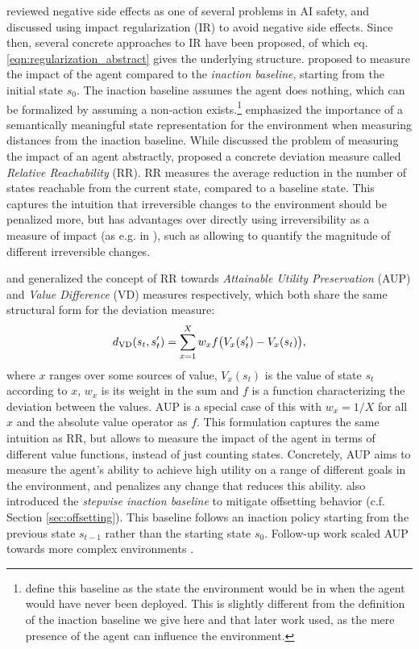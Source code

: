 \documentclass[letterpaper]{article} %
\begin{document}
\citet{amodei2016concrete} reviewed negative side effects as one of several problems in AI safety, and discussed using impact regularization (IR) to avoid negative side effects.
Since then, several concrete approaches to IR have been proposed, of which eq. \eqref{eqn:regularization_abstract} gives the underlying structure. \citet{armstrong2017low} proposed to measure the impact of the agent compared to the \textit{inaction baseline}, starting from the initial state $s_0$. The inaction baseline assumes the agent does nothing, which can be formalized by assuming a non-action exists.\footnote{\citet{armstrong2017low} define this baseline as the state the environment would be in when the agent would have never been deployed. This is slightly different from the definition of the inaction baseline we give here and that later work used, as the mere presence of the agent can influence the environment.} \citet{armstrong2017low} emphasized the importance of a semantically meaningful state representation for the environment when measuring distances from the inaction baseline.
While \citet{armstrong2017low} discussed the problem of measuring the impact of an agent abstractly, \citet{krakovna2018penalizing} proposed a concrete deviation measure called \textit{Relative Reachability} (RR). RR measures the average reduction in the number of states reachable from the current state, compared to a baseline state. This captures the intuition that irreversible changes to the environment should be penalized more, but has advantages over directly using irreversibility as a measure of impact (as e.g. in \citet{eysenbach2017leave}), such as allowing to quantify the magnitude of different irreversible changes.

\citet{turner2020conservative} and \citet{krakovna2018penalizing} generalized the concept of RR towards \textit{Attainable Utility Preservation} (AUP) and \textit{Value Difference} (VD) measures respectively, which both share the same structural form for the deviation measure:
\begin{align}\label{eq:value differences}
    d_{\textnormal{VD}}(s_t, s'_t) = \sum_{x=1}^{X} w_x f\big(V_x(s'_t) - V_x(s_t)\big),
\end{align}
where $x$ ranges over some sources of value, $V_x(s_t)$ is the value of state $s_t$ according to $x$, $w_x$ is its weight in the sum and $f$ is a function characterizing the deviation between the values. AUP is a special case of this with $w_x=1/X$ for all $x$ and the absolute value operator as $f$. This formulation captures the same intuition as RR, but allows to measure the impact of the agent in terms of different value functions, instead of just counting states. Concretely, AUP aims to measure the agent's ability to achieve high utility on a range of different goals in the environment, and penalizes any change that reduces this ability.
\citet{turner2020conservative} also introduced the \textit{stepwise inaction baseline} to mitigate offsetting behavior (c.f. Section \ref{sec:offsetting}). This baseline follows an inaction policy starting from the previous state $s_{t-1}$ rather than the starting state $s_0$. Follow-up work scaled AUP towards more complex environments \citep{turner2020avoiding}. 
\end{document}
